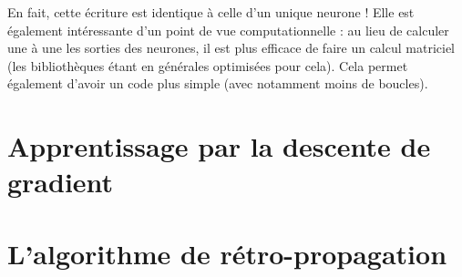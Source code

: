 En fait, cette écriture est identique à celle d'un unique neurone !
Elle est également intéressante d'un point de vue computationnelle : au lieu 
de calculer une à une les sorties des neurones, il est plus efficace de faire 
un calcul matriciel (les bibliothèques étant en générales optimisées pour cela).
Cela permet également d'avoir un code plus simple (avec notamment moins de boucles).

\section{Apprentissage par la descente de gradient}



\section{L'algorithme de rétro-propagation}


